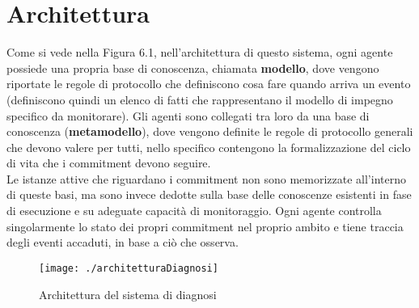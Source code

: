 \documentclass[a4paper,12pt]{report}
\begin{document}
\section{Architettura}
Come si vede nella Figura 6.1, nell'architettura di questo sistema, ogni agente possiede una propria base di conoscenza, chiamata \textbf{modello}, dove vengono riportate le regole di protocollo che definiscono cosa fare quando arriva un evento (definiscono quindi un elenco di fatti che rappresentano il modello di impegno specifico da monitorare). Gli agenti sono collegati tra loro da una base di conoscenza (\textbf{metamodello}), dove vengono definite le regole di protocollo generali che devono valere per tutti, nello specifico contengono la formalizzazione del ciclo di vita che i commitment devono seguire.\\
Le istanze attive che riguardano i commitment non sono memorizzate all'interno di queste basi, ma sono invece dedotte sulla base delle conoscenze esistenti in fase di esecuzione e su adeguate capacità di monitoraggio.
\newpage
Ogni agente controlla singolarmente lo stato dei propri commitment nel proprio ambito e tiene traccia degli eventi accaduti, in base a ciò che osserva.
\begin{figure}[h]
\begin{center}
    \texttt{[image: ./architetturaDiagnosi]}
    \caption{Architettura del sistema di diagnosi}
    \label{diagnosi}
\end{center}
\end{figure}
\newpage
\end{document}
